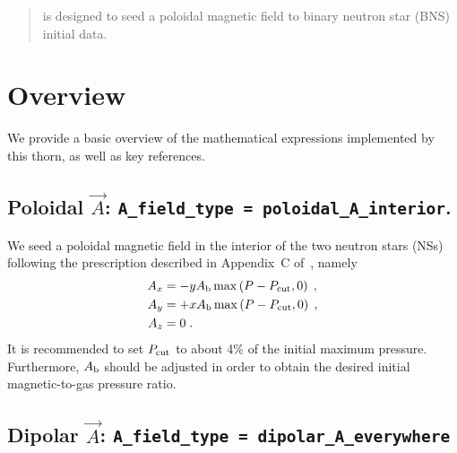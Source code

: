 \newcommand{\GiR}{{\texttt{GiRaFFE}}}
\newcommand{\IGM}{{\texttt{IllinoisGRMHD}}}

\linespread{1.0}

\newenvironment{packed_itemize}{
\begin{itemize}
  \setlength{\itemsep}{0.0pt}
  \setlength{\parskip}{0.0pt}
  \setlength{\parsep}{ 0.0pt}
}{\end{itemize}}

\newenvironment{packed_enumerate}{
\begin{enumerate}
  \setlength{\itemsep}{0.0pt}
  \setlength{\parskip}{0.0pt}
  \setlength{\parsep}{ 0.0pt}
}{\end{enumerate}}

\begin{abstract}
  \thornname is designed to seed a poloidal magnetic field to binary
  neutron star (BNS) initial data.
\end{abstract}

\section{Overview}
\label{sec:overview}

We provide a basic overview of the mathematical expressions implemented
by this thorn, as well as key references.

\subsection{Poloidal $\vec{A}$: \texttt{A\_field\_type = poloidal\_A\_interior}.}
\label{sec:poloidal_A_interior}

We seed a poloidal magnetic field in the interior of the two neutron
stars (NSs) following the prescription described in Appendix~C
of~\cite{etienne2015illinoisgrmhd}, namely
\begin{align}
  A_{x} &= -yA_{\rm b}\max\left(P-P_{\rm cut},0\right)\;,\\
  A_{y} &= +xA_{\rm b}\max\left(P-P_{\rm cut},0\right)\;,\\
  A_{z} &= 0\;.
\end{align}
It is recommended to set $P_{\rm cut}$ to about 4\% of the initial
maximum pressure. Furthermore, $A_{\rm b}$ should be adjusted in order
to obtain the desired initial magnetic-to-gas pressure ratio.


\subsection{Dipolar $\vec{A}$: \texttt{A\_field\_type = dipolar\_A\_everywhere}}
\label{sec:dipolar_A_everywhere}

